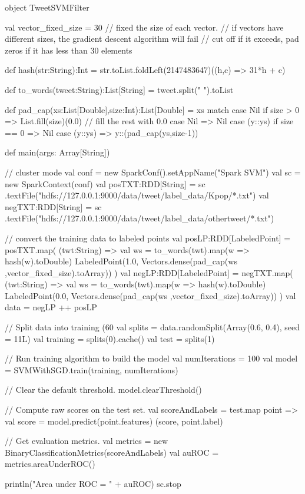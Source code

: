 \documentclass[10pt]{article}
\begin{document}
\begin{code}
object TweetSVMFilter {

  val vector_fixed_size = 30 
  // fixed the size of each vector. 
  // if vectors have different sizes, the gradient descent algorithm will fail
  // cut off if it exceeds, pad zeros if it has less than 30 elements

  def hash(str:String):Int = str.toList.foldLeft(2147483647)((h,c) => 31*h + c)
  
  def to_words(tweet:String):List[String] = tweet.split(" ").toList

  def pad_cap(xs:List[Double],size:Int):List[Double] = xs match 
  {
    case Nil if size > 0 => List.fill(size)(0.0) // fill the rest with 0.0
    case Nil             => Nil 
    case (y::ys) if size == 0 => Nil
    case (y::ys)              => y::(pad_cap(ys,size-1))
  }

  def main(args: Array[String]) {
     
    // cluster mode
    val conf = new SparkConf().setAppName("Spark SVM")
    val sc = new SparkContext(conf)
    val posTXT:RDD[String] = sc
      .textFile("hdfs://127.0.0.1:9000/data/tweet/label_data/Kpop/*.txt") 
    val negTXT:RDD[String] = sc
      .textFile("hdfs://127.0.0.1:9000/data/tweet/label_data/othertweet/*.txt") 
    
    // convert the training data to labeled points
    val posLP:RDD[LabeledPoint] = posTXT.map( (twt:String) => 
    {
      val ws = to_words(twt).map(w => hash(w).toDouble)
      LabeledPoint(1.0, Vectors.dense(pad_cap(ws ,vector_fixed_size).toArray))
    })
    val negLP:RDD[LabeledPoint] = negTXT.map( (twt:String) => 
    { 
      val ws = to_words(twt).map(w => hash(w).toDouble)
      LabeledPoint(0.0, Vectors.dense(pad_cap(ws ,vector_fixed_size).toArray))
    })
    val data = negLP ++ posLP

    // Split data into training (60%
    val splits = data.randomSplit(Array(0.6, 0.4), seed = 11L)
    val training = splits(0).cache()
    val test = splits(1)

    // Run training algorithm to build the model
    val numIterations = 100
    val model = SVMWithSGD.train(training, numIterations)

    // Clear the default threshold.
    model.clearThreshold()

    // Compute raw scores on the test set. 
    val scoreAndLabels = test.map { point =>
      val score = model.predict(point.features)
      (score, point.label)
    }

    // Get evaluation metrics.
    val metrics = new BinaryClassificationMetrics(scoreAndLabels)
    val auROC = metrics.areaUnderROC()

    println("Area under ROC = " + auROC)	
    sc.stop
  }
}
\end{code}
\end{document}
